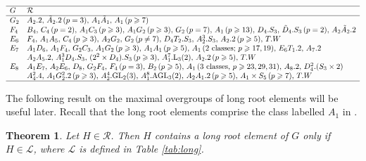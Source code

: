 \documentclass[twoside,a4paper,reqno,11pt]{amsart}
\newcommand{\<}{\langle}
\renewcommand{\>}{\rangle}
\newcommand{\geqs}{\geqslant}
\renewcommand{\:}{\colon}
\theoremstyle{plain}
\newtheorem{thm}{Theorem}[section]
\theoremstyle{definition}
\begin{document}
\renewcommand{\arraystretch}{1.2}
{\small
\begin{table}
\[
\begin{array}{ll} \hline
G & \mathcal{R} \\ \hline
G_2 & A_2.2, \, \tilde{A}_2.2 \, (p=3), \, A_1\tilde{A}_1, \, A_1 \, (p \geqs 7) \\
F_4 & B_4, \, C_4 \, (p=2), \, A_1C_3 \, (p \geqs 3), \, A_1G_2 \, (p \geqs 3), \, G_2 \, (p=7), \, A_1 \, (p \geqs 13), \, D_4.S_3, \, \tilde{D}_4.S_3 \, (p=2), \, A_2\tilde{A}_2.2 \\ 
E_6 & F_4, \, A_1A_5, \, C_4 \, (p \geqs 3), \, A_2G_2, \, G_2 \, (p \ne 7), \, D_4T_2.S_3,\, A_2^3.S_3, \, A_2.2 \, (p \geqs 5), \, T.W \\
E_7 & A_1D_6, \, A_1F_4, \, G_2C_3, \, A_1G_2 \, (p \geqs 3), \, A_1A_1 \, (p \geqs 5), \,   A_1\, (\mbox{$2$ classes; $p \geqs 17,19$}), \, E_6T_1.2, \, A_7.2 \\ 
& A_2A_5.2,\, A_1^3D_4.S_3, \, (2^2 \times D_4).S_3 \, (p \geqs 3), \, A_1^7.{\rm L}_3(2), \, A_2.2 \, (p \geqs 5), \, T.W \\ 
E_8 & A_1E_7, \, A_2E_6, \, D_8, \, G_2F_4, \, F_4 \, (p=3), \, B_2 \, (p \geqs 5), \, A_1 \, (\mbox{$3$ classes, $p \geqs 23,29,31$}), \, A_8.2, \, D_4^2.(S_3 \times 2) \\
& A_4^2.4, \, A_1G_2^2.2 \, (p \geqs 3), \,  A_2^4.{\rm GL}_2(3), \, A_1^8.{\rm AGL}_3(2), \, A_2A_1.2 \, (p \geqs 5), \, A_1 \times S_5 \, (p \geqs 7),\, T.W  \\ \hline
\end{array}
\]
\caption{The collection $\mathcal{R}$ of reductive maximal subgroups of $G$}
\label{tab:max}
\end{table}}
\renewcommand{\arraystretch}{1}

The following result on the maximal overgroups of long root elements will be useful later. Recall that the long root elements comprise the class labelled $A_1$ in \cite[Tables 22.2.1-5]{LS_book}.

\begin{thm}\label{t:long}
Let $H \in \mathcal{R}$. Then $H$ contains a long root element of $G$ only if $H \in \mathcal{L}$, where $\mathcal{L}$ is defined in Table \ref{tab:long}.
\end{thm}
\end{document}
